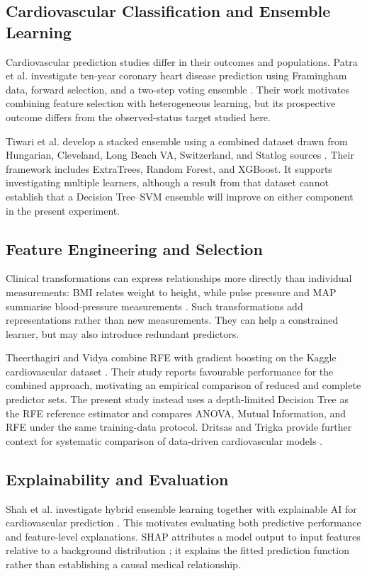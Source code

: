 \documentclass[11pt,a4paper]{article}
\begin{document}
\subsection{Cardiovascular Classification and Ensemble Learning}
Cardiovascular prediction studies differ in their outcomes and populations. Patra et al. investigate ten-year coronary heart disease prediction using Framingham data, forward selection, and a two-step voting ensemble \cite{patra2023}. Their work motivates combining feature selection with heterogeneous learning, but its prospective outcome differs from the observed-status target studied here.

Tiwari et al. develop a stacked ensemble using a combined dataset drawn from Hungarian, Cleveland, Long Beach VA, Switzerland, and Statlog sources \cite{tiwari2022}. Their framework includes ExtraTrees, Random Forest, and XGBoost. It supports investigating multiple learners, although a result from that dataset cannot establish that a Decision Tree--SVM ensemble will improve on either component in the present experiment.

\subsection{Feature Engineering and Selection}
Clinical transformations can express relationships more directly than individual measurements: BMI relates weight to height, while pulse pressure and MAP summarise blood-pressure measurements \cite{whoObesity2025,sesso2000}. Such transformations add representations rather than new measurements. They can help a constrained learner, but may also introduce redundant predictors.

Theerthagiri and Vidya combine RFE with gradient boosting on the Kaggle cardiovascular dataset \cite{theerthagiri2022}. Their study reports favourable performance for the combined approach, motivating an empirical comparison of reduced and complete predictor sets. The present study instead uses a depth-limited Decision Tree as the RFE reference estimator and compares ANOVA, Mutual Information, and RFE under the same training-data protocol. Dritsas and Trigka provide further context for systematic comparison of data-driven cardiovascular models \cite{dritsas2023}.

\subsection{Explainability and Evaluation}
Shah et al. investigate hybrid ensemble learning together with explainable AI for cardiovascular prediction \cite{shah2025}. This motivates evaluating both predictive performance and feature-level explanations. SHAP attributes a model output to input features relative to a background distribution \cite{lundberg2017}; it explains the fitted prediction function rather than establishing a causal medical relationship.
\end{document}
